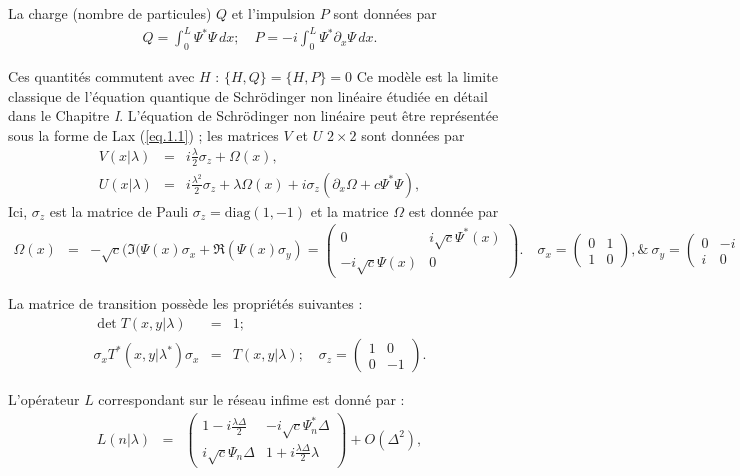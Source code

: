 La charge (nombre de particules) \( Q \) et l'impulsion \( P \) sont données par
\begin{eqnarray}
    Q = \int_0^L  \Psi^\ast \Psi \, dx ; \quad  P = -i \int_0^L \Psi^\ast \partial_x \Psi \, dx.
\end{eqnarray}

Ces quantités commutent avec \( H \) : $\{H, Q\} = \{H, P\} = 0$ 
Ce modèle est la limite classique de l'équation quantique de Schrödinger non linéaire étudiée en détail dans le Chapitre \textit{I}. L'équation de Schrödinger non linéaire peut être représentée sous la forme de Lax (\ref{eq.1.1}) ; les matrices \( V \) et \( U \) \( 2 \times 2 \) sont données par
\begin{eqnarray}
    V(x\vert\lambda) &  = & i \frac{\lambda}2 \sigma_z + \Omega(x), \\
    U(x\vert\lambda) & =  &i \frac{\lambda^2}2 \sigma_z + \lambda\Omega(x) + i \sigma_z ( \partial_x \Omega + c \Psi^\ast \Psi ),
\end{eqnarray}
Ici, \( \sigma_z \) est la matrice de Pauli \( \sigma_z = \mathrm{diag}(1, -1) \) et la matrice \( \Omega \) est donnée par
\begin{eqnarray}
    \Omega(x) & = & -\sqrt{c} (  \Im(\Psi(x) \sigma_x + \Re(\Psi(x) \sigma_y) =   \left ( \begin{array}{cc}  0 & i \sqrt{c} \Psi^\ast ( x) \\   - i \sqrt{c} \Psi ( x) & 0  \end{array} \right ) . \quad \sigma_x = \left ( \begin{array}{cc}  0 & 1\\  1  & 0  \end{array} \right ) ,  \& ~\sigma_y = \left ( \begin{array}{cc}  0 & -i\\  i  & 0  \end{array} \right )
\end{eqnarray}

La matrice de transition possède les propriétés suivantes :
\begin{eqnarray}
    \det T(x, y|\lambda) & =  & 1;\\
    \sigma_x T^*(x, y|\lambda^*) \sigma_x & = & T(x, y|\lambda); \quad \sigma_z = \begin{pmatrix} 1 & 0 \\ 0 & -1 \end{pmatrix}.
\end{eqnarray}

L'opérateur \( L \) correspondant sur le réseau infime est donné par :
\begin{eqnarray}
    L(n|\lambda) & =  &\begin{pmatrix} 1 - i \frac{\lambda \Delta}{2}  & -i \sqrt{c} \Psi_n^\ast \Delta  \\ i \sqrt{c} \Psi_n \Delta  & 1 + i \frac{\lambda \Delta}{2} \lambda \end{pmatrix} + O ( \Delta^2 ) , 
\end{eqnarray}

